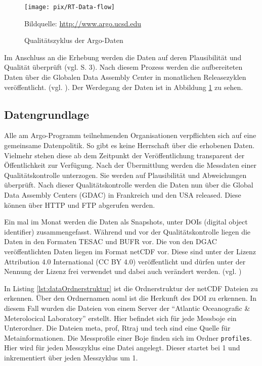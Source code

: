     \begin{figure}[!ht]
        \centering
        \texttt{[image: pix/RT-Data-flow]}
        \caption[Qualitätszyklus der Argo-Daten]{Qualitätszyklus der Argo-Daten}
        \footnotesize{
            Bildquelle: \href{http://www.argo.ucsd.edu/Argo_data_and.html}%
                        {\url{http://www.argo.ucsd.edu}}
        }


        \label{fig:argo_dataflow}
    \end{figure}

    Im Anschluss an die Erhebung werden die Daten auf deren Plausibilität und Qualität überprüft (vgl. \cite{ArgoDataBeginnersGuide} S. 3). Nach diesem Prozess werden die aufbereiteten Daten über die Globalen Data Assembly Center in monatlichen Releasezyklen veröffentlicht. (vgl. \cite{Argofloa92:online}). Der Werdegang der Daten ist in Abbildung \ref{fig:argo_dataflow} zu sehen.

\subsection{Datengrundlage}


    Alle am Argo-Programm teilnehmenden Organisationen verpflichten sich auf eine gemeinsame Datenpolitik. So gibt es keine Herrschaft über die erhobenen Daten. Vielmehr stehen diese ab dem Zeitpunkt der Veröffentlichung transparent der Öffentlichkeit zur Verfügung.
    Nach der Übermittlung werden die Messdaten einer Qualitätskontrolle unterzogen. Sie werden auf Plausibilität und Abweichungen überprüft. Nach dieser Qualitätskontrolle werden die Daten nun über die Global Data Assembly Centers (GDAC) in Frankreich und den USA released. Diese können über HTTP und FTP abgerufen werden.

    Ein mal im Monat werden die Daten als Snapshots, unter DOIs (digital object identifier) zusammengefasst.
    Während und vor der Qualitätskontrolle liegen die Daten in den Formaten TESAC und BUFR vor.
    Die von den DGAC veröffentlichten Daten liegen im Format netCDF vor. Diese sind unter der Lizenz Attribution 4.0 International (CC BY 4.0) veröffentlicht und dürfen unter der Nennung der Lizenz frei verwendet und dabei auch verändert werden. (vgl. \cite{ArgoDataDocumentation})



In Listing \ref{lst:dataOrdnerstruktur} ist die Ordnerstruktur der netCDF Dateien zu erkennen. Über den Ordnernamen aoml ist die Herkunft des DOI zu erkennen. In diesem Fall wurden die Dateien von einem Server der  "`Atlantic Oceanografic \& Meterolocical Laboratory"' erstellt. Hier befindet sich für jede Messboje ein Unterordner.  Die Dateien meta, prof, Rtraj und tech sind eine Quelle für Metainformationen. Die Messprofile einer Boje finden sich im Ordner \texttt{profiles}. Hier wird für jeden Messzyklus eine Datei angelegt. Dieser startet bei 1 und inkrementiert über jeden Messzyklus um 1.

